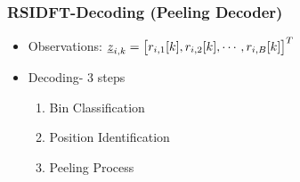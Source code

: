 \begin{frame}\frametitle{RSIDFT-Decoding (Peeling Decoder)}

		\begin{figure}[h!]
			\begin{center}
				\resizebox{0.55\textwidth}{!}{}	
			\end{center}	   
		\end{figure}
		
		
			\begin{block}{}
						\begin{itemize}
							\item {\color{blue} Observations:} $
							\underline{z}_{i,k} = \begin{bmatrix}
							r_{i,1}[k],
							r_{i,2}[k],
							\cdots,
							r_{i,B}[k]
							\end{bmatrix}^{T}  
							$
							\item Decoding- 3 steps
							\begin{enumerate}
								\item Bin Classification
								\item Position Identification
								\item Peeling Process
							\end{enumerate}
						\end{itemize}
			\end{block}
			
\end{frame}

